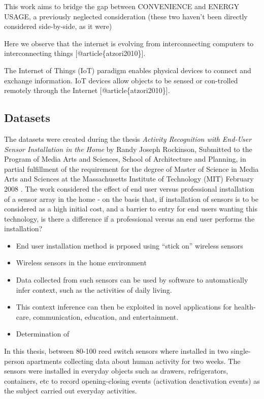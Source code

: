 \documentclass[11pt]{article}
\providecommand{\tightlist}{%
      \setlength{\itemsep}{0pt}\setlength{\parskip}{0pt}}
\begin{document}
This work aims to bridge the gap between CONVENIENCE and ENERGY USAGE, a
previously neglected consideration (these two haven't been directly
considered side-by-side, as it were)

Here we observe that the internet is evolving from interconnecting
computers to interconnecting things {[}@article\{atzori2010\}{]}.

The Internet of Things (IoT) paradigm enables physical devices to
connect and exchange information. IoT devices allow objects to be sensed
or con-trolled remotely through the Internet
{[}@article\{atzori2010\}{]}. 

    

    \hypertarget{datasets}{%
\subsection{Datasets}\label{datasets}}

    The datasets were created during the thesis \emph{Activity Recognition
with End-User Sensor Installation in the Home} by Randy Joseph
Rockinson, Submitted to the Program of Media Arts and Sciences, School
of Architecture and Planning, in partial fulfillment of the requirement
for the degree of Master of Science in Media Arts and Sciences at the
Massachusetts Institute of Technology (MIT) February 2008
. The work considered the effect of end user
versus professional installation of a sensor array in the home - on the
basis that, if installation of sensors is to be considered as a high
initial cost, and a barrier to entry for end users wanting this
technology, is there a difference if a professional versus an end user
performs the installation?

\begin{itemize}
\tightlist
\item
  End user installation method is prposed using ``stick on'' wireless
  sensors
\item
  Wireless sensors in the home environment
\item
  Data collected from such sensors can be used by software to
  automatically infer context, such as the activities of daily living.
\item
  This context inference can then be exploited in novel applications for
  health-care, communication, education, and entertainment.
\item
  Determination of
\end{itemize}

In this thesis, between 80-100 reed switch sensors where installed in
two single-person apartments collecting data about human activity for
two weeks. The sensors were installed in everyday objects such as
drawers, refrigerators, containers, etc to record opening-closing events
(activation deactivation events) as the subject carried out everyday
activities.
\end{document}
